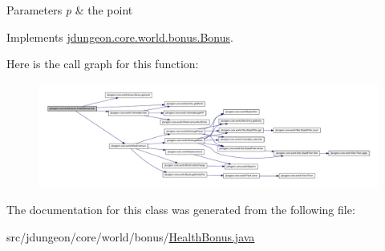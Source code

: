 \begin{DoxyParams}{Parameters}
{\em p} & the point \\
\hline
\end{DoxyParams}


Implements \hyperlink{classjdungeon_1_1core_1_1world_1_1bonus_1_1_bonus_a169b5e5d01c584e378c9f043b9bba196}{jdungeon.core.world.bonus.Bonus}.



Here is the call graph for this function:
\nopagebreak
\begin{figure}[H]
\begin{center}
\leavevmode
\includegraphics[width=400pt]{classjdungeon_1_1core_1_1world_1_1bonus_1_1_health_bonus_ae951e5a939df28a8b3f1436c13e3953a_cgraph}
\end{center}
\end{figure}




The documentation for this class was generated from the following file:\begin{DoxyCompactItemize}
\item 
src/jdungeon/core/world/bonus/\hyperlink{_health_bonus_8java}{HealthBonus.java}\end{DoxyCompactItemize}
